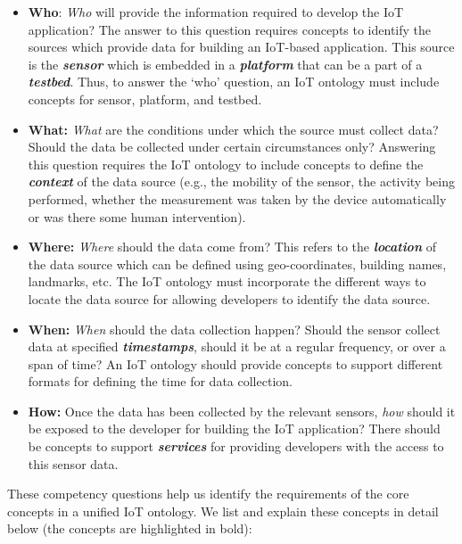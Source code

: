 \documentclass{elsart}  %
\begin{document}
\begin{itemize}
\item{\textbf{Who}: \textit{Who} will provide the information required to develop the IoT application? The answer to this question requires concepts to identify the sources which provide data for building an IoT-based application. This source is the \textit{\textbf{sensor}} which is embedded in a \textit{\textbf{platform}} that can be a part of a \textit{\textbf{testbed}}. Thus, to answer the `who' question, an IoT ontology must include concepts for sensor, platform, and testbed.} 
\item{\textbf{What:} \textit{What} are the conditions under which the source must collect data? Should the data be collected under certain circumstances only? Answering this question requires the IoT ontology to include concepts to define the \textit{\textbf{context}} of the data source (e.g., the mobility of the sensor, the activity being performed, whether the measurement was taken by the device automatically or was there some human intervention).}
\item{\textbf{Where:} \textit{Where} should the data come from? This refers to the \textit{\textbf{location}} of the data source which can be defined using geo-coordinates, building names, landmarks, etc. The IoT ontology must incorporate the different ways to locate the data source for allowing developers to identify the data source.}
\item{\textbf{When: }\textit{When} should the data collection happen? Should the sensor collect data at specified \textit{\textbf{timestamps}}, should it be at a regular frequency, or over a span of time? An IoT ontology should provide concepts to support different formats for defining the time for data collection.}
\item{\textbf{How: }Once the data has been collected by the relevant sensors, \textit{how} should it be exposed to the developer for building the IoT application? There should be concepts to support \textit{\textbf{services}} for providing developers with the access to this sensor data.}
\end{itemize}
These competency questions help us identify the requirements of the core concepts in a unified IoT ontology. We list and explain these concepts in detail below (the concepts are highlighted in bold):
\end{document}
